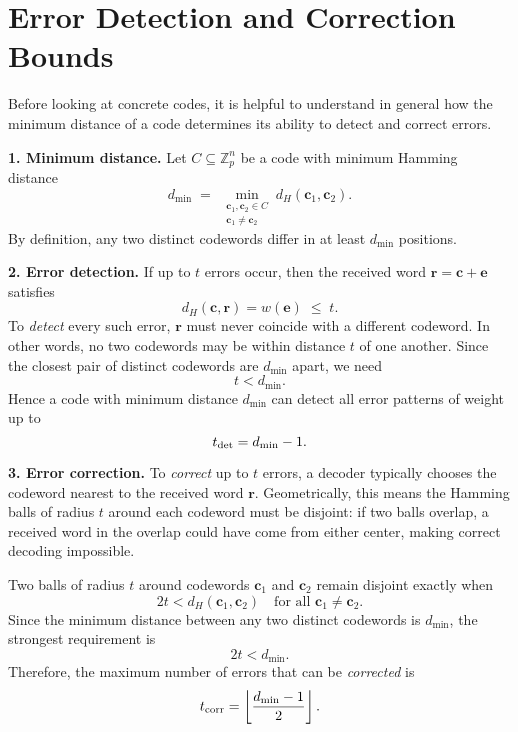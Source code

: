 \documentclass[docmute]{article}
\begin{document}
\section{Error Detection and Correction Bounds}

Before looking at concrete codes, it is helpful to understand in general how the minimum distance of a code determines its ability to detect and correct errors.

\bigskip

\noindent\textbf{1. Minimum distance.}  Let \(C\subseteq\mathbb{Z}_p^n\) be a code with minimum Hamming distance
\[
  d_{\min}
  \;=\;
  \min_{\substack{\mathbf{c}_1,\mathbf{c}_2\in C\\\mathbf{c}_1\neq\mathbf{c}_2}}
  d_H(\mathbf{c}_1,\mathbf{c}_2).
\]
By definition, any two distinct codewords differ in at least \(d_{\min}\) positions.

\medskip

\noindent\textbf{2. Error detection.}  
If up to \(t\) errors occur, then the received word \(\mathbf{r} = \mathbf{c} + \mathbf{e}\) satisfies
\[
  d_H(\mathbf{c},\mathbf{r}) = w(\mathbf{e}) \;\le\; t.
\]
To \emph{detect} every such error, \(\mathbf{r}\) must never coincide with a different codeword.  In other words, no two codewords may be within distance \(t\) of one another.  Since the closest pair of distinct codewords are \(d_{\min}\) apart, we need
\[
  t < d_{\min}.
\]
Hence a code with minimum distance \(d_{\min}\) can detect all error patterns of weight up to
\[
  t_{\rm det} = d_{\min}-1.
\]

\medskip

\noindent\textbf{3. Error correction.}  
To \emph{correct} up to \(t\) errors, a decoder typically chooses the codeword nearest to the received word \(\mathbf{r}\).  Geometrically, this means the Hamming balls of radius \(t\) around each codeword must be disjoint: if two balls overlap, a received word in the overlap could have come from either center, making correct decoding impossible.

Two balls of radius \(t\) around codewords \(\mathbf{c}_1\) and \(\mathbf{c}_2\) remain disjoint exactly when
\[
  2t < d_H(\mathbf{c}_1,\mathbf{c}_2)
  \quad\text{for all }\mathbf{c}_1\neq\mathbf{c}_2.
\]
Since the minimum distance between any two distinct codewords is \(d_{\min}\), the strongest requirement is
\[
  2t < d_{\min}.
\]
Therefore, the maximum number of errors that can be \emph{corrected} is
\[
  t_{\rm corr} = \left\lfloor \frac{d_{\min}-1}{2} \right\rfloor.
\]
\end{document}
